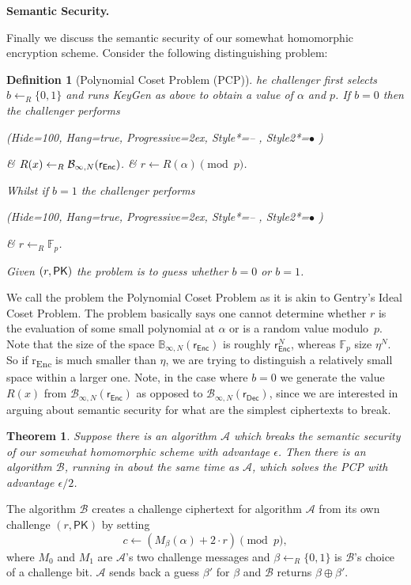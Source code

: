 \documentclass[a4paper, 12pt]{article}
\newtheorem{definition}{Definition}
\newtheorem{theorem}{Theorem}
\newenvironment{capsproof}[1][\proofname]{\proof[\scshape #1:]}{\endproof}
\newcommand{\bb}[1]{\mathbb{#1}}
\newcommand{\mc}[1]{\mathcal{#1}}
\newcommand{\tsf}[1]{\textsf{#1}}
\newcommand{\tbf}[1]{\textbf{#1}}
\newcommand{\tss}[1]{\textsubscript{#1}}
\newcommand*\xor{\mathbin{\oplus}}
\newenvironment{bparagraph}[1]{
	\vspace{2ex}\noindent\tbf{#1. }\nolinebreak 
}{\vspace{2ex}}
\newenvironment{defaultlist}{
	\begin{easylist}
		\ListProperties(Hide=100, Hang=true, Progressive=2ex, Style*=-- , Style2*=$\bullet$ )
	}{\end{easylist}}
\begin{document}
	\begin{bparagraph}{Semantic Security}
		Finally we discuss the semantic security of our somewhat homomorphic encryption scheme. 
		Consider the following distinguishing problem:
		\begin{definition}[Polynomial Coset Problem (PCP)]
			he challenger first	selects $b \leftarrow _R \{0, 1\}$ and runs {\normalfont \tsf{KeyGen}} as above to obtain a value of $\alpha$ and $p$. If $b = 0$ then the challenger performs
			\begin{defaultlist}
				& $R(x) \leftarrow _R \mc{B}_{\infty, N}({\normalfont \tsf{r}_\tsf{Enc}})$.
				& $r \leftarrow R(\alpha) \pmod{p}$.
			\end{defaultlist}
			\noindent
			Whilst if $b = 1$ the challenger performs
			\begin{defaultlist}
				& $r \leftarrow _R \bb{F}_p$.
			\end{defaultlist}
			\noindent
			Given ${\normalfont (r, \tsf{PK})}$ the problem is to guess whether $b = 0$ or $b = 1$.
		\end{definition}
		\noindent
		We call the problem the Polynomial Coset Problem as it is akin to Gentry's Ideal Coset Problem.
		The problem basically says one cannot determine	whether $r$ is the evaluation of some small polynomial at $\alpha$ or is a random value modulo~$p$.
		Note that the size of the space $\bb{B}_{\infty,N}(\tsf{r}_\tsf{Enc})$ is roughly $\tsf{r}_\tsf{Enc}^N$, whereas $\bb{F}_p$ size $\eta^N$. 
		So if \tsf{r\tss{Enc}} is much smaller than $\eta$, we are trying to distinguish a relatively small space within a larger one.
		Note, in the case where $b = 0$ we generate the value $R(x)$ from $\mc{B}_{\infty, N}(\tsf{r}_\tsf{Enc})$ as opposed to $\mc{B}_{\infty, N}(\tsf{r}_\tsf{Dec})$, since we are interested in arguing about semantic security for what are the simplest ciphertexts to break.
		
		\begin{theorem}
			Suppose there is an algorithm $\mc{A}$ which breaks the semantic security of our somewhat homomorphic scheme with advantage $\epsilon$. Then there is an algorithm $\mc{B}$, running in about the same time as $\mc{A}$, which solves the PCP with advantage $\epsilon/2$.
		\end{theorem}
		
		
		\begin{capsproof}
			The algorithm $\mc{B}$ creates a challenge ciphertext for algorithm $\mc{A}$ from its own challenge $(r, \tsf{PK})$ by setting
			\[
			c \leftarrow (M_\beta(\alpha) + 2 \cdot r) \pmod{p},
			\]
			where $M_0$ and $M_1$ are $\mc{A}$'s two challenge messages and $\beta \leftarrow _R \{0, 1\}$ is $\mc{B}$'s choice of a challenge bit. $\mc{A}$ sends back a guess $\beta '$ for $\beta$ and $\mc{B}$ returns $\beta \xor \beta '$.
			

\end{capsproof}
\end{bparagraph}
\end{document}
